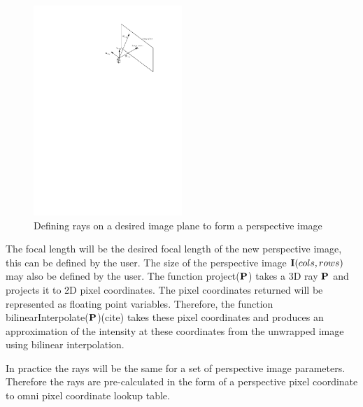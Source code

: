 \begin{figure}[h!]
  \centering
    \includegraphics[width=0.5\textwidth]{chapters/images/omni_perspective}
  \caption{Defining rays on a desired image plane to form a perspective image}
  \label{fig:omni_perspective}
\end{figure}

The focal length will be the desired focal length of the new perspective image, this can be defined by the user.  The size of the perspective image $\mathbf I(cols, rows)$ may also be defined by the user.  The function project($\mathbf P$) takes a 3D ray $\mathbf P$ and projects it to 2D pixel coordinates.  The pixel coordinates returned will be represented as floating point variables.  Therefore, the function bilinearInterpolate($\mathbf P$)(cite) takes these pixel coordinates and produces an approximation of the intensity at these coordinates from the unwrapped image using bilinear interpolation.

In practice the rays will be the same for a set of perspective image parameters.  Therefore the rays are pre-calculated in the form of a perspective pixel coordinate to omni pixel coordinate lookup table.

